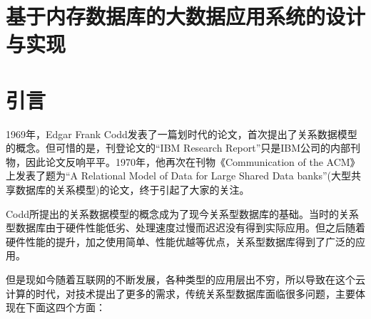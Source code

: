 \documentclass[literaturereview]{zjutreport}
\begin{document}



\frontmatter

\begingroup %
\let\clearpage\relax %

\titleformat{\chapter}[block]{\sihao\heiti\filcenter\bfseries}{\CJKnumber{\thechapter}}{1ex}{}{} %
\chapter*{基于内存数据库的大数据应用系统的设计与实现}
{} %


\mainmatter
\chapter{引言}
1969年，Edgar Frank Codd发表了一篇划时代的论文，首次提出了关系数据模型的概念。但可惜的是，刊登论文的“IBM Research Report”只是IBM公司的内部刊物，因此论文反响平平。1970年，他再次在刊物《Communication of the ACM》上发表了题为“A Relational Model of Data for Large Shared Data banks”(大型共享数据库的关系模型)的论文，终于引起了大家的关注。

Codd所提出的关系数据模型的概念成为了现今关系型数据库的基础。当时的关系型数据库\cite{ref:1}由于硬件性能低劣、处理速度过慢而迟迟没有得到实际应用。但之后随着硬件性能的提升，加之使用简单、性能优越等优点，关系型数据库得到了广泛的应用。

但是现如今随着互联网的不断发展，各种类型的应用层出不穷，所以导致在这个云计算的时代，对技术提出了更多的需求，传统关系型数据库面临很多问题，主要体现在下面这四个方面：
\end{document}
